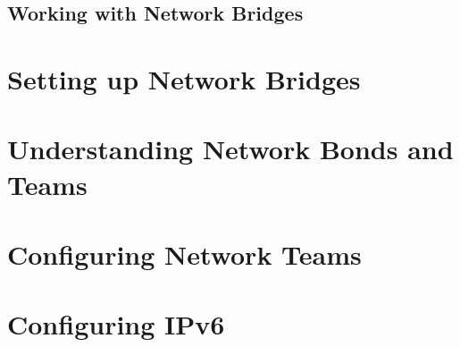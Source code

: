 	\subsection{Working with Network Bridges}
	
	
	\section{Setting up Network Bridges}
	\section{Understanding Network Bonds and Teams}
	\section{Configuring Network Teams}
	\section{Configuring IPv6} 
	



